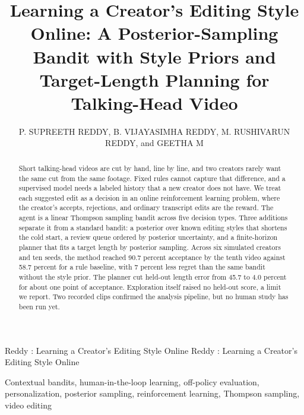 \documentclass{ieeeaccess}
\begin{document}

\title{Learning a Creator's Editing Style Online: A Posterior-Sampling Bandit with Style Priors and Target-Length Planning for Talking-Head Video}
\author{\uppercase{P. Supreeth Reddy},
\uppercase{B. Vijayasimha Reddy},
\uppercase{M. Rushivarun Reddy}, and
\uppercase{Geetha M}}
\address[1]{Department of Computer Science and Engineering, Amrita School of Computing, Amrita Vishwa Vidyapeetham, Amritapuri, Kerala, India (e-mail: am.sc.u4ae23142@am.students.amrita.edu, am.sc.u4aie23110@am.students.amrita.edu,\newline am.sc.u4aie23128@am.students.amrita.edu, geetham@am.amrita.edu)}

\markboth
{Reddy \headeretal: Learning a Creator's Editing Style Online}
{Reddy \headeretal: Learning a Creator's Editing Style Online}


\begin{abstract}
Short talking-head videos are cut by hand, line by line, and two creators rarely want the same cut from the same footage. Fixed rules cannot capture that difference, and a supervised model needs a labeled history that a new creator does not have. We treat each suggested edit as a decision in an online reinforcement learning problem, where the creator's accepts, rejections, and ordinary transcript edits are the reward. The agent is a linear Thompson sampling bandit across five decision types. Three additions separate it from a standard bandit: a posterior over known editing styles that shortens the cold start, a review queue ordered by posterior uncertainty, and a finite-horizon planner that fits a target length by posterior sampling. Across six simulated creators and ten seeds, the method reached 90.7 percent acceptance by the tenth video against 58.7 percent for a rule baseline, with 7 percent less regret than the same bandit without the style prior. The planner cut held-out length error from 45.7 to 4.0 percent for about one point of acceptance. Exploration itself raised no held-out score, a limit we report. Two recorded clips confirmed the analysis pipeline, but no human study has been run yet.
\end{abstract}

\begin{keywords}
Contextual bandits, human-in-the-loop learning, off-policy evaluation, personalization, posterior sampling, reinforcement learning, Thompson sampling, video editing
\end{keywords}
\end{document}
